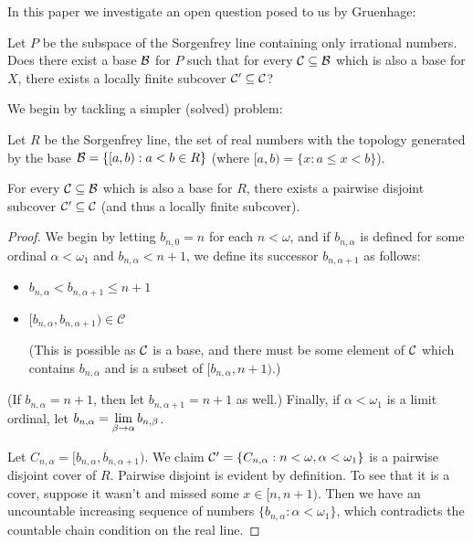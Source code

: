 



In this paper we investigate an open question posed to us by Gruenhage:

\begin{question}
Let $P$ be the subspace of the Sorgenfrey line containing only irrational numbers. Does there exist a base $\mathcal{B}$ for $P$ such that for every $\mathcal{C}\subseteq\mathcal{B}$ which is also a base for $X$, there exists a locally finite subcover $\mathcal{C}'\subseteq\mathcal{C}$?
\end{question}

We begin by tackling a simpler (solved) problem:

\begin{proposition}
Let $R$ be the Sorgenfrey line, the set of real numbers with the topology generated by the base $\mathcal{B} = \{[a,b): a<b\in R\}$ (where $[a,b) = \{x : a\leq x < b\}$).

For every $\mathcal{C}\subseteq\mathcal{B}$ which is also a base for $R$, there exists a pairwise disjoint subcover $\mathcal{C}'\subseteq\mathcal{C}$ (and thus a locally finite subcover).
\end{proposition}

\begin{proof}
We begin by letting $b_{n,0}=n$ for each $n<\omega$, and if $b_{n,\alpha}$ is defined for some ordinal $\alpha<\omega_1$ and $b_{n,\alpha}<n+1$, we define its successor $b_{n,\alpha+1}$ as follows:
  \begin{itemize}
    \item $b_{n,\alpha} < b_{n,\alpha+1} \leq n+1$
    \item $[b_{n,\alpha},b_{n,\alpha+1})\in \mathcal{C}$ 

    (This is possible as $\mathcal{C}$ is a base, and there must be some element of $\mathcal{C}$ which contains $b_{n,\alpha}$ and is a subset of $[b_{n,\alpha},n+1)$.)
  \end{itemize}
(If $b_{n,\alpha}=n+1$, then let $b_{n,\alpha+1}=n+1$ as well.) Finally, if $\alpha<\omega_1$ is a limit ordinal, let $\displaystyle b_{n,\alpha} = \lim_{\beta\to\alpha}b_{n,\beta}$.

Let $C_{n,\alpha} = [b_{n,\alpha},b_{n,\alpha+1})$. We claim $\mathcal{C}' = \{C_{n,\alpha} : n<\omega,\alpha<\omega_1\}$ is a pairwise disjoint cover of $R$. Pairwise disjoint is evident by definition. To see that it is a cover, suppose it wasn't and missed some $x\in[n,n+1)$. Then we have an uncountable increasing sequence of numbers $\{b_{n,\alpha}:\alpha<\omega_1\}$, which contradicts the countable chain condition on the real line.
\end{proof}

